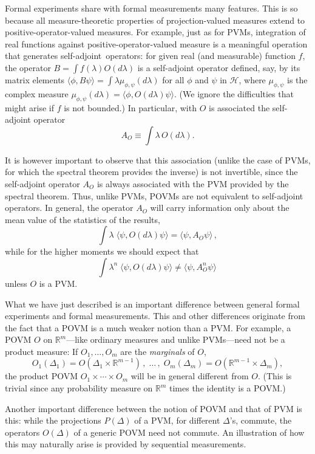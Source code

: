 \documentclass[12pt]{article}
\newcommand{\sa}{self-adjoint}
\newcommand{\lam}{\lambda}
\renewcommand{\H}{\mbox{$\mathcal{H}$}}
\newcommand{\R}{\mathbb{R}}
\begin{document}
Formal experiments share with formal measurements many features.  This
is so because all measure-theoretic properties of projection-valued
measures extend to positive-operator-valued measures.  For example,
just as for PVMs, integration of real functions against
positive-operator-valued measure is a meaningful operation that
generates \sa\ operators: for given real (and measurable) function
$f$, the operator $B=\int f(\lambda) O(d\lambda)$ is a \sa{} operator
defined, say, by its matrix elements $\langle \phi,B \psi\rangle =\int
\lambda \mu_{\phi,\psi}(d\lambda)$ for all $\phi$ and $\psi$ in $\H$,
where $\mu_{\phi,\psi}$ is the complex measure
$\mu_{\phi,\psi}(d\lambda) = \langle \phi,O(d\lambda) \psi\rangle$.
(We ignore the difficulties that might arise if $f$ is not bounded.)
In particular, with $O$ is associated the \sa{} operator
\begin{equation}
\label{sawpov}
A_{O} \equiv \int \lam \, O (d\lam).
\end{equation}

It is however important to observe that this association (unlike the
case of PVMs, for which the spectral theorem provides the inverse) is
not invertible, since the \sa{} operator $A_{O}$ is always associated
with the PVM provided by the spectral theorem. Thus, unlike PVMs,
POVMs are not equivalent to \sa{} operators. In general, the operator
$A_{O}$ will carry information only about the mean value of the
statistics of the results,
$$
\int \lam\;\langle \psi, O(d\lam)\psi\rangle = \langle\psi,
A_{O}\psi\rangle \,,
$$
while for the higher moments we should expect that
$$
\int \lam^n\;\langle \psi, O(d\lam)\psi\rangle \neq \langle\psi,
A_{O}^n\psi\rangle \,
$$
unless $O$ is a PVM.

What we have just described is an important difference between general
formal experiments and formal measurements.  This and other
differences originate {}from the fact that a POVM is a much weaker
notion than a PVM. For example, a POVM $O$ on $\R^m$---like ordinary
measures and unlike PVMs---need not be a product measure: If $
O_1,\ldots, O_m$ are the \emph{marginals} of $ O$,
$$
O_1(\Delta_1) = O(\Delta_1 \times \R^{m-1})\,,\;\ldots\,,\;
O_m(\Delta_m) = O(\R^{m-1} \times \Delta_m ),
$$
the product POVM $ O_1\times\cdots\times O_m$ will be in general
different {}from $ O$. (This is trivial since any probability measure
on $\R^m$ times the identity is a POVM.)

Another important difference between the notion of POVM and that of
PVM is this: while the projections $P(\Delta)$ of a PVM, for different
$\Delta$'s, commute, the operators $O(\Delta)$ of a generic POVM need
not commute. An illustration of how this may naturally arise is
provided by sequential measurements.
\end{document}
